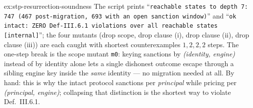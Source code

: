 \documentclass[11pt,a4paper]{article}
\theoremstyle{definition}
\newcounter{protocol}[section]
\begin{document}
\begin{pdsolution}{ex:stp-resurrection-soundness}
The script prints ``\texttt{reachable states to depth 7: 747 (467
post-migration, 693 with an open sanction window)}'' and ``\texttt{ok
intact: ZERO Def-III.6.1 violations over all reachable states [internal]}'';
the four mutants (drop scope, drop clause (i), drop clause (ii), drop clause
(iii)) are each caught with shortest counterexamples $1, 2, 2, 2$ steps. The
one-step break is the scope mutant \texttt{m0}: keying sanctions by
\emph{(identity, engine)} instead of by identity alone lets a single dishonest
outcome escape through a sibling engine key inside the \emph{same} identity
--- no migration needed at all. By hand: this is why the intact protocol
sanctions per \emph{principal} while pricing per \emph{(principal, engine)};
collapsing that distinction is the shortest way to violate Def.~III.6.1.
\end{pdsolution}

\end{document}
